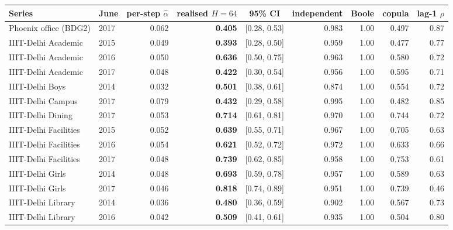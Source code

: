\begin{table}[t]
\centering
\footnotesize
\setlength{\tabcolsep}{3.5pt}
\begin{tabular}{llrrcrrrr}
\toprule
Series & June & per-step $\hat\alpha$ & realised $H{=}64$ & 95\% CI & independent & Boole & copula & lag-1 $\rho$ \\
\midrule
Phoenix office (BDG2) & 2017 & 0.062 & \textbf{0.405} & [0.28, 0.53] & 0.983 & 1.00 & 0.497 & 0.87 \\
\midrule
IIIT-Delhi Academic & 2015 & 0.049 & \textbf{0.393} & [0.28, 0.50] & 0.959 & 1.00 & 0.477 & 0.77 \\
IIIT-Delhi Academic & 2016 & 0.050 & \textbf{0.636} & [0.50, 0.75] & 0.963 & 1.00 & 0.580 & 0.72 \\
IIIT-Delhi Academic & 2017 & 0.048 & \textbf{0.422} & [0.30, 0.54] & 0.956 & 1.00 & 0.595 & 0.71 \\
IIIT-Delhi Boys & 2014 & 0.032 & \textbf{0.501} & [0.38, 0.61] & 0.874 & 1.00 & 0.554 & 0.72 \\
IIIT-Delhi Campus & 2017 & 0.079 & \textbf{0.432} & [0.29, 0.58] & 0.995 & 1.00 & 0.482 & 0.85 \\
IIIT-Delhi Dining & 2017 & 0.053 & \textbf{0.714} & [0.61, 0.81] & 0.970 & 1.00 & 0.744 & 0.72 \\
IIIT-Delhi Facilities & 2015 & 0.052 & \textbf{0.639} & [0.55, 0.71] & 0.967 & 1.00 & 0.705 & 0.63 \\
IIIT-Delhi Facilities & 2016 & 0.054 & \textbf{0.621} & [0.52, 0.72] & 0.972 & 1.00 & 0.633 & 0.66 \\
IIIT-Delhi Facilities & 2017 & 0.048 & \textbf{0.739} & [0.62, 0.85] & 0.958 & 1.00 & 0.753 & 0.61 \\
IIIT-Delhi Girls & 2014 & 0.048 & \textbf{0.693} & [0.59, 0.78] & 0.957 & 1.00 & 0.589 & 0.63 \\
IIIT-Delhi Girls & 2017 & 0.046 & \textbf{0.818} & [0.74, 0.89] & 0.951 & 1.00 & 0.739 & 0.46 \\
IIIT-Delhi Library & 2014 & 0.036 & \textbf{0.480} & [0.36, 0.59] & 0.902 & 1.00 & 0.567 & 0.73 \\
IIIT-Delhi Library & 2016 & 0.042 & \textbf{0.509} & [0.41, 0.61] & 0.935 & 1.00 & 0.504 & 0.80 \\
\bottomrule
\end{tabular}

\end{table}
